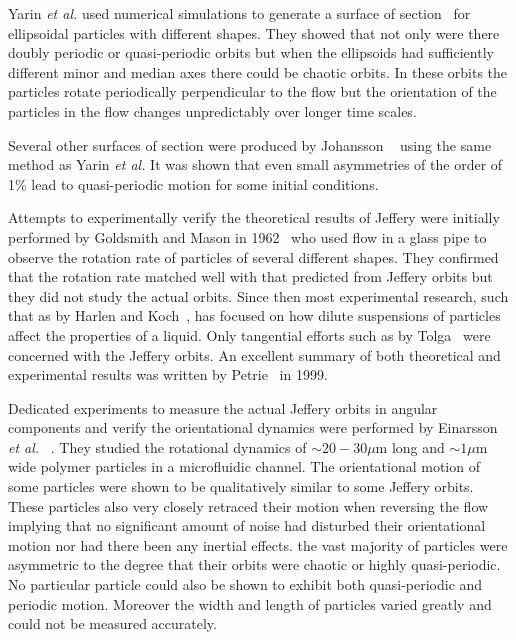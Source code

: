 Yarin \emph{et al.} used numerical simulations to generate a surface of section~\cite{SurfaceOfSection} for ellipsoidal particles with different shapes. They showed that not only were there doubly periodic or quasi-periodic orbits but when the ellipsoids had sufficiently different minor and median axes there could be chaotic orbits. In these orbits the particles rotate periodically perpendicular to the flow but the orientation of the particles in the flow changes unpredictably over longer time scales. %

Several other surfaces of section were produced by Johansson ~\cite{AntonThesis} using the same method as Yarin \emph{et al.} It was shown that even small asymmetries of the order of 1\% lead to quasi-periodic motion for some initial conditions.

Attempts to experimentally verify the theoretical results of Jeffery were initially performed by Goldsmith and Mason in 1962~\cite{Mason} who used flow in a glass pipe to observe the rotation rate of particles of several different shapes. They confirmed that the rotation rate matched well with that predicted from Jeffery orbits but they did not study the actual orbits. Since then most experimental research, such that as by Harlen and Koch~\cite{fibersspension}, has focused on how dilute suspensions of particles affect the properties of a liquid. Only tangential efforts such as by Tolga~\cite{Tolga} were concerned with the Jeffery orbits. An excellent summary of both theoretical and experimental results was written by Petrie~\cite{Petrie} in 1999.

Dedicated experiments to measure the actual Jeffery orbits in angular components and verify the orientational dynamics were performed by Einarsson \emph{et al.} ~\cite{JonasExperiment}. They studied the rotational dynamics of $\sim 20-30 \mu$m long and $\sim 1\mu$m wide polymer particles in a microfluidic channel. The orientational motion of some particles were shown to be qualitatively similar to some Jeffery orbits. These particles also very closely retraced their motion when reversing the flow implying that no significant amount of noise had disturbed their orientational motion nor had there been any inertial effects. the vast majority of particles were asymmetric to the degree that their orbits were chaotic or highly quasi-periodic. No particular particle could also be shown to exhibit both quasi-periodic and periodic motion. Moreover the width and length of particles varied greatly and could not be measured accurately.

